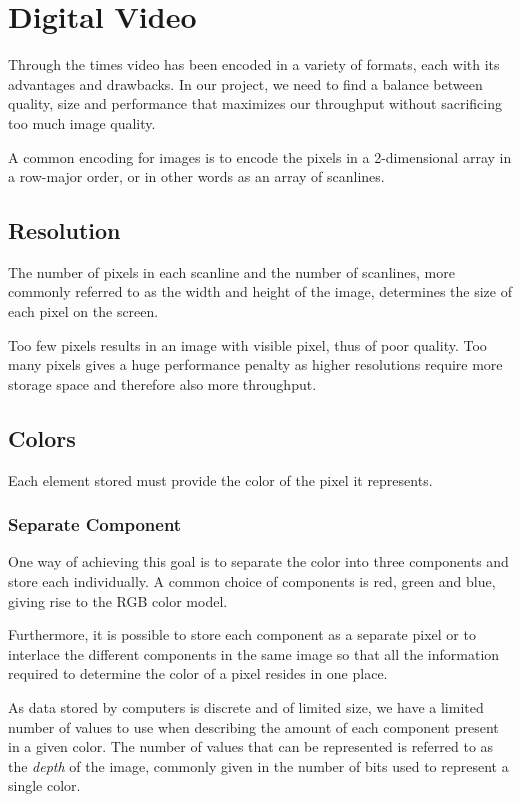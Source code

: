 \section{Digital Video}
Through the times video has been encoded in a variety of formats, each with its advantages and drawbacks.
In our project, we need to find a balance between quality, size and performance that maximizes our throughput without sacrificing too much image quality.

A common encoding for images is to encode the pixels in a 2-dimensional array in a row-major order, or in other words as an array of scanlines.

\subsection{Resolution}
The number of pixels in each scanline and the number of scanlines, more commonly referred to as the width and height of the image, determines the size of each pixel on the screen.

Too few pixels results in an image with visible pixel, thus of poor quality.
Too many pixels gives a huge performance penalty as higher resolutions require more storage space and therefore also more throughput.

\subsection{Colors}
Each element stored must provide the color of the pixel it represents.

\subsubsection{Separate Component}
One way of achieving this goal is to separate the color into three components and store each individually.
A common choice of components is red, green and blue, giving rise to the RGB color model.

Furthermore, it is possible to store each component as a separate pixel or to interlace the different components in the same image so that all the information required to determine the color of a pixel resides in one place.

As data stored by computers is discrete and of limited size, we have a limited number of values to use when describing the amount of each component present in a given color.
The number of values that can be represented is referred to as the \textit{depth} of the image, commonly given in the number of bits used to represent a single color.

